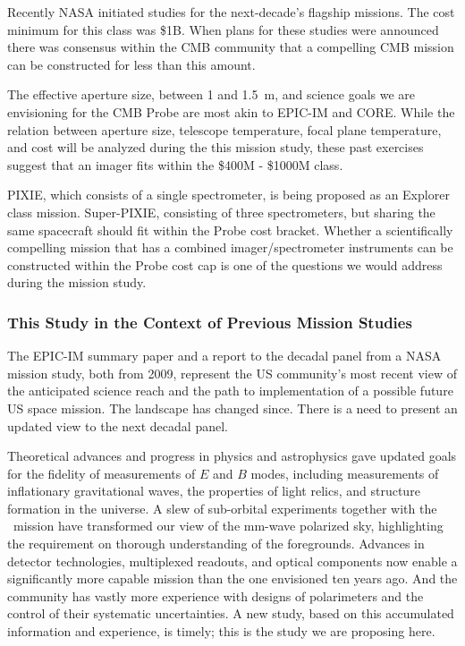 Recently NASA initiated studies for the next-decade's flagship missions. The cost minimum for this 
class was \$1B. When plans for these studies were announced 
there was consensus within the CMB community that a compelling CMB mission can be constructed for 
less than this amount.  

The effective aperture size, between 1 and 1.5~m, and science goals we are envisioning for the 
CMB Probe are most akin to EPIC-IM and CORE. While the relation between aperture size, 
telescope temperature, focal plane temperature, and cost will be analyzed during the this 
mission study, these past exercises suggest that an imager fits within the \$400M - \$1000M class.

PIXIE, which consists of a single spectrometer, is being proposed as an Explorer class mission. 
Super-PIXIE, consisting of three spectrometers, but sharing the same spacecraft should fit 
within the Probe cost bracket. Whether a scientifically compelling mission that has 
a combined imager/spectrometer instruments can be constructed within the Probe cost cap 
is one of the questions we would address during the mission study. 


\vspace{-0.18in}

\subsubsection{This Study in the Context of Previous Mission Studies} 

\vspace{-0.05in}

The EPIC-IM summary paper and a report to the decadal panel from a NASA mission study, both from 2009, represent 
the US community's most recent view of the anticipated 
science reach and the path to implementation of a possible future US space mission. The landscape 
has changed since.  There is a need to present an updated view to the next decadal panel.  

Theoretical advances and progress in physics and astrophysics gave updated 
goals for the fidelity of measurements of $E$ and $B$ modes, including measurements of inflationary 
gravitational waves, the properties of light relics, and structure formation in the universe. A 
slew of sub-orbital experiments together with the \planck\ mission have 
transformed our view of the mm-wave polarized sky, highlighting the requirement on 
thorough understanding of the foregrounds. Advances in detector technologies, multiplexed readouts,
and optical components now enable a significantly more capable mission than the one envisioned
ten years ago. And the community has vastly more experience with designs of polarimeters and 
the control of their systematic uncertainties.  A new study, based on this accumulated information and 
experience, is timely; this is the study we are proposing here. 

